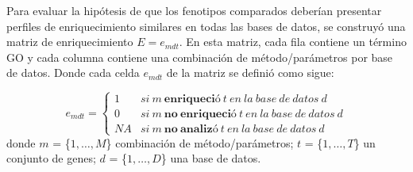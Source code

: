 \documentclass[12pt,twoside]{reedthesis}
\begin{document}
\par

Para evaluar la hipótesis de que los fenotipos comparados deberían presentar perfiles de enriquecimiento similares en todas las bases de datos, se construyó una matriz de enriquecimiento \(E=e_{mdt}\). En esta matriz, cada fila contiene un término GO y cada columna contiene una combinación de método/parámetros por base de datos. Donde cada celda \(e_{mdt}\) de la matriz se definió como sigue:

\[
e_{mdt}=\left\{\begin{matrix}
1 & si\:m\:\mathbf{enriqueció}\:t\:en\:la\:base\:de\:datos\:d \\
0 & si\:m\:\mathbf{no\:enriqueció}\:t\:en\:la\:base\:de\:datos\:d \\
NA & si\:m\:\mathbf{no\:analizó}\:t\:en\:la\:base\:de\:datos\:d
\end{matrix}\right.
\]
donde \(m\) = \{\(1,\ldots,M\)\} combinación de método/parámetros; \(t\) = \{\(1,\ldots,T\)\} un conjunto de genes; \(d\) = \{\(1,\ldots,D\)\} una base de datos.

\par
\end{document}
